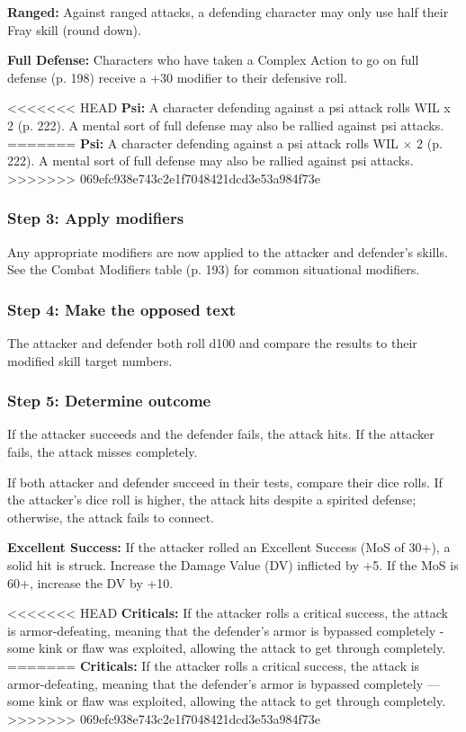 \textbf{Ranged:} Against ranged attacks, a defending character may only use half their Fray skill (round down). 

\textbf{Full Defense:} Characters who have taken a Complex Action to go on full defense (p. 198) receive a +30 modifier to their defensive roll. 

<<<<<<< HEAD \textbf{Psi:} A character defending against a psi attack rolls WIL x 2 (p. 222). A mental sort of full defense may also be rallied against psi attacks. ======= \textbf{Psi:} A character defending against a psi attack rolls WIL $\times$ 2 (p. 222). A mental sort of full defense may also be rallied against psi attacks. >>>>>>> 069efc938e743c2e1f7048421dcd3e53a984f73e 

\subsubsection{Step 3: Apply modifiers} 

Any appropriate modifiers are now applied to the attacker and defender’s skills. See the Combat Modifiers table (p. 193) for common situational modifiers. 

\subsubsection{Step 4: Make the opposed text} 

The attacker and defender both roll d100 and compare the results to their modified skill target numbers. 

\subsubsection{Step 5: Determine outcome} 

If the attacker succeeds and the defender fails, the attack hits. If the attacker fails, the attack misses completely. 

If both attacker and defender succeed in their tests, compare their dice rolls. If the attacker’s dice roll is higher, the attack hits despite a spirited defense; otherwise, the attack fails to connect. 

\textbf{Excellent Success:} If the attacker rolled an Excellent Success (MoS of 30+), a solid hit is struck. Increase the Damage Value (DV) inflicted by +5. If the MoS is 60+, increase the DV by +10. 

<<<<<<< HEAD \textbf{Criticals:} If the attacker rolls a critical success, the attack is armor-defeating, meaning that the defender’s armor is bypassed completely - some kink or flaw was exploited, allowing the attack to get through completely. ======= \textbf{Criticals:} If the attacker rolls a critical success, the attack is armor-defeating, meaning that the defender’s armor is bypassed completely --- some kink or flaw was exploited, allowing the attack to get through completely. >>>>>>> 069efc938e743c2e1f7048421dcd3e53a984f73e 

